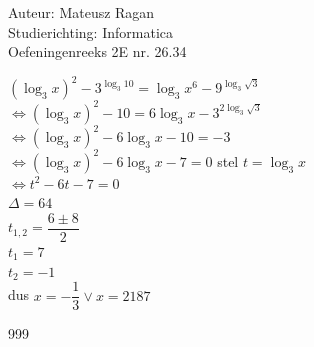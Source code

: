 \documentclass[a4paper]{article}
\begin{document}
\noindent \large Auteur: Mateusz Ragan \\
\noindent \large Studierichting: Informatica\\
\noindent \large Oefeningenreeks 2E nr. 26.34\\

\medskip

\normalsize

$\left( \log_{3}x\right)^2 - 3^{\log_{3}10} = \log_{3}x^6 - 9^{\log_{3}\sqrt{3}}$\\

$\Leftrightarrow \left( \log_{3}x\right)^2 - 10 = 6\log_{3}x - 3^{2\log_{3}\sqrt{3}}$\\

$\Leftrightarrow \left( \log_{3}x\right)^2 - 6\log_{3}x -10 = -3$\\

$\Leftrightarrow \left( \log_{3}x\right)^2 - 6\log_{3}x -7 = 0$ stel $t = \log_{3}x $\\

$\Leftrightarrow t^2 - 6t - 7 = 0$\\

$\Delta = 64$\\

$t_{1,2} = \dfrac{6\pm8}{2}$\\

$t_{1} = 7$\\

$t_{2} = -1$\\

dus $x = -\dfrac{1}{3} \vee x = 2187$









\begin{thebibliography}{999}
\end{thebibliography}
\end{document}
